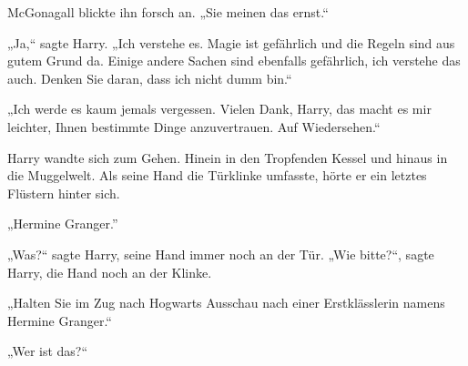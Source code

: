 McGonagall blickte ihn forsch an. „Sie meinen das ernst.“

„Ja,“ sagte Harry. „Ich verstehe es. Magie ist gefährlich und die Regeln sind aus gutem Grund da. Einige andere Sachen sind ebenfalls gefährlich, ich verstehe das auch. Denken Sie daran, dass ich nicht dumm bin.“

„Ich werde es kaum jemals vergessen. Vielen Dank, Harry, das macht es mir leichter, Ihnen bestimmte Dinge anzuvertrauen. Auf Wiedersehen.“

Harry wandte sich zum Gehen. Hinein in den Tropfenden Kessel und hinaus in die Muggelwelt. Als seine Hand die Türklinke umfasste, hörte er ein letztes Flüstern hinter sich.


„Hermine Granger.”

„Was?“ sagte Harry, seine Hand immer noch an der Tür.
„Wie bitte?“, sagte Harry, die Hand noch an der Klinke.

„Halten Sie im Zug nach Hogwarts Ausschau nach einer Erstklässlerin namens Hermine Granger.“

„Wer ist das?“

